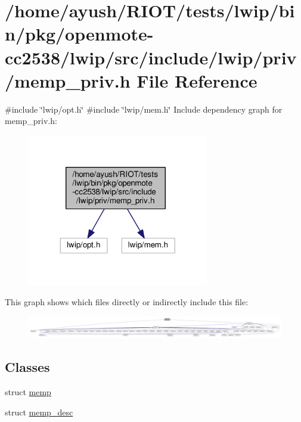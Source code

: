 \hypertarget{openmote-cc2538_2lwip_2src_2include_2lwip_2priv_2memp__priv_8h}{}\section{/home/ayush/\+R\+I\+O\+T/tests/lwip/bin/pkg/openmote-\/cc2538/lwip/src/include/lwip/priv/memp\+\_\+priv.h File Reference}
\label{openmote-cc2538_2lwip_2src_2include_2lwip_2priv_2memp__priv_8h}
{\ttfamily \#include \char`\"{}lwip/opt.\+h\char`\"{}}\newline
{\ttfamily \#include \char`\"{}lwip/mem.\+h\char`\"{}}\newline
Include dependency graph for memp\+\_\+priv.\+h\+:
\nopagebreak
\begin{figure}[H]
\begin{center}
\leavevmode
\includegraphics[width=224pt]{openmote-cc2538_2lwip_2src_2include_2lwip_2priv_2memp__priv_8h__incl}
\end{center}
\end{figure}
This graph shows which files directly or indirectly include this file\+:
\nopagebreak
\begin{figure}[H]
\begin{center}
\leavevmode
\includegraphics[width=350pt]{openmote-cc2538_2lwip_2src_2include_2lwip_2priv_2memp__priv_8h__dep__incl}
\end{center}
\end{figure}
\subsection*{Classes}
\begin{DoxyCompactItemize}
\item 
struct \hyperlink{structmemp}{memp}
\item 
struct \hyperlink{structmemp__desc}{memp\+\_\+desc}
\end{DoxyCompactItemize}
